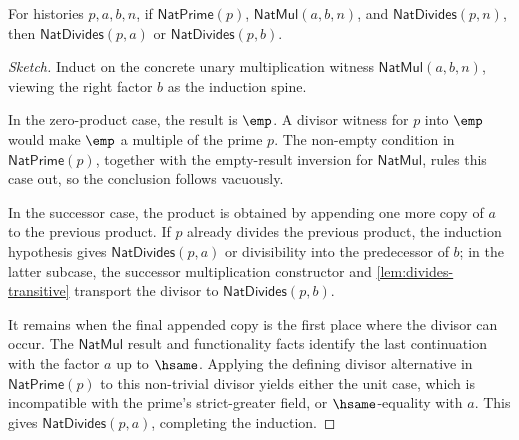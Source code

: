 \begin{theorem}
\label{thm:prime-divides-product-factor}
For histories \(p,a,b,n\), if \(\mathsf{NatPrime}(p)\),
\(\mathsf{NatMul}(a,b,n)\), and \(\mathsf{NatDivides}(p,n)\), then
\(\mathsf{NatDivides}(p,a)\) or \(\mathsf{NatDivides}(p,b)\).
\end{theorem}
\begin{proof}[Sketch]
Induct on the concrete unary multiplication witness
\(\mathsf{NatMul}(a,b,n)\), viewing the right factor \(b\) as the induction
spine.

In the zero-product case, the result is \(\emp\). A divisor witness for \(p\)
into \(\emp\) would make \(\emp\) a multiple of the prime \(p\). The non-empty
condition in \(\mathsf{NatPrime}(p)\), together with the empty-result inversion
for \(\mathsf{NatMul}\), rules this case out, so the conclusion follows
vacuously.

In the successor case, the product is obtained by appending one more copy of
\(a\) to the previous product. If \(p\) already divides the previous product,
the induction hypothesis gives \(\mathsf{NatDivides}(p,a)\) or divisibility
into the predecessor of \(b\); in the latter subcase, the successor
multiplication constructor and \autoref{lem:divides-transitive} transport the
divisor to \(\mathsf{NatDivides}(p,b)\).

It remains when the final appended copy is the first place where the divisor
can occur. The \(\mathsf{NatMul}\) result and functionality facts identify the
last continuation with the factor \(a\) up to \(\hsame\). Applying the defining
divisor alternative in \(\mathsf{NatPrime}(p)\) to this non-trivial divisor
yields either the unit case, which is incompatible with the prime's
strict-greater field, or \(\hsame\)-equality with \(a\). This gives
\(\mathsf{NatDivides}(p,a)\), completing the induction.
\end{proof}
